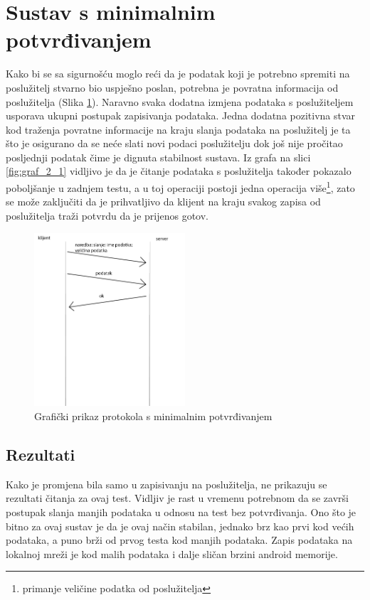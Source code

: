 \documentclass[times, utf8, zavrsni, square]{fer}
\begin{document}
\section{Sustav s minimalnim potvrđivanjem}
Kako bi se sa sigurnošću moglo reći da je podatak koji je potrebno spremiti na poslužitelj stvarno bio uspješno poslan, potrebna je povratna informacija od poslužitelja (Slika \ref{fig:graf_3}).
Naravno svaka dodatna izmjena podataka s poslužiteljem usporava ukupni postupak zapisivanja podataka. 
Jedna dodatna pozitivna stvar kod traženja povratne informacije na kraju slanja podataka na poslužitelj je ta što je osigurano da se neće slati novi podaci poslužitelju dok još nije pročitao posljednji podatak čime je dignuta stabilnost sustava.
Iz grafa na slici \ref{fig:graf_2_1} vidljivo je da je čitanje podataka s poslužitelja također pokazalo poboljšanje u zadnjem testu, a u toj operaciji postoji jedna operacija više\footnote{primanje veličine podatka od poslužitelja}, zato se može zaključiti da je prihvatljivo da klijent na kraju svakog zapisa od poslužitelja traži potvrdu da je prijenos gotov.

\begin{figure}[t]
    \centering
    \includegraphics[width=0.5\textwidth]{graf_slanje_3}
    \caption{Grafički prikaz protokola s minimalnim potvrđivanjem}
    \label{fig:graf_3}
\end{figure}
\FloatBarrier
\subsection{Rezultati}
Kako je promjena bila samo u zapisivanju na poslužitelja, ne prikazuju se rezultati čitanja za ovaj test.
Vidljiv je rast u vremenu potrebnom da se završi postupak slanja manjih podataka u odnosu na test bez potvrđivanja.
Ono što je bitno za ovaj sustav je da je ovaj način stabilan, jednako brz kao prvi kod većih podataka, a puno brži od prvog testa kod manjih podataka.
Zapis podataka na lokalnoj mreži je kod malih podataka i dalje sličan brzini android memorije.
\end{document}
